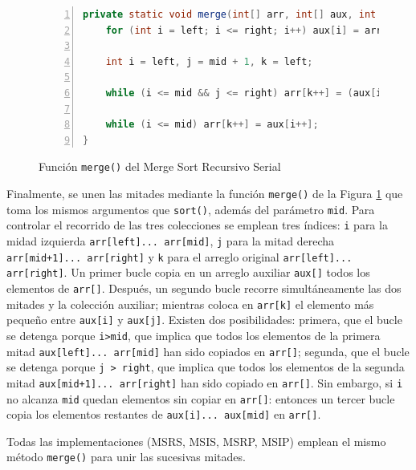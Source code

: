 \documentclass[titlepage]{article}
\begin{document}
\begin{figure}[h]
    \begin{lstlisting}[language=java, frame=single, numbers=left]
private static void merge(int[] arr, int[] aux, int left, int mid, int right) {
	for (int i = left; i <= right; i++) aux[i] = arr[i];
	
	int i = left, j = mid + 1, k = left;
	
	while (i <= mid && j <= right) arr[k++] = (aux[i] <= aux[j])? aux[i++] : aux[j++];
	
	while (i <= mid) arr[k++] = aux[i++];
}
    \end{lstlisting}
    \caption{Función \lstinline{merge()} del Merge Sort Recursivo Serial}
    \label{fig:MSRS_merge()}
\end{figure}

Finalmente, se unen las mitades mediante la función \lstinline{merge()} de la Figura \ref{fig:MSRS_merge()} que toma los mismos argumentos que \lstinline{sort()}, además del parámetro \lstinline{mid}. Para controlar el recorrido de las tres colecciones se emplean tres índices: \lstinline{i} para la midad izquierda \lstinline{arr[left]... arr[mid]}, \lstinline{j} para la mitad derecha \lstinline{arr[mid+1]... arr[right]} y \lstinline{k} para el arreglo original \lstinline{arr[left]... arr[right]}. Un primer bucle copia en un arreglo auxiliar \lstinline{aux[]} todos los elementos de \lstinline{arr[]}. Después, un segundo bucle recorre simultáneamente las dos mitades y la colección auxiliar; mientras coloca en \lstinline{arr[k]} el elemento más pequeño entre \lstinline{aux[i]} y \lstinline{aux[j]}. Existen dos posibilidades: primera, que el bucle se detenga porque \lstinline{i>mid}, que implica que todos los elementos de la primera mitad \lstinline{aux[left]... arr[mid]} han sido copiados en \lstinline{arr[]}; segunda, que el bucle se detenga porque \lstinline{j > right}, que implica que todos los elementos de la segunda mitad \lstinline{aux[mid+1]... arr[right]} han sido copiado en \lstinline{arr[]}. Sin embargo, si \lstinline{i} no alcanza \lstinline{mid} quedan elementos sin copiar en \lstinline{arr[]}: entonces un tercer bucle copia los elementos restantes de \lstinline{aux[i]... aux[mid]} en \lstinline{arr[]}.

Todas las implementaciones (MSRS, MSIS, MSRP, MSIP) emplean el mismo método \lstinline{merge()} para unir las sucesivas mitades.
\end{document}
